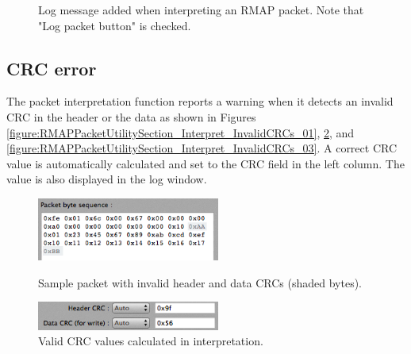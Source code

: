 \documentclass[a4paper,10pt]{article}
\begin{document}
\begin{figure}[htb]
\begin{center}
\begin{minipage}[t]{0.45\hsize}
\begin{center}
\vspace{-2mm}
\caption{Log message added when interpreting an RMAP packet. Note that "Log packet button" is checked. }
\label{figure:RMAPPacketUtilitySection_Log_Interpret}
\end{center}
\end{minipage}
\end{center}
\end{figure}


\subsection{CRC error}
The packet interpretation function reports a warning when it detects an invalid CRC in the header or the data as shown in Figures \ref{figure:RMAPPacketUtilitySection_Interpret_InvalidCRCs_01}, \ref{figure:RMAPPacketUtilitySection_Interpret_InvalidCRCs_02}, and \ref{figure:RMAPPacketUtilitySection_Interpret_InvalidCRCs_03}.
A correct CRC value is automatically calculated and set to the CRC field in the left column. The value is also displayed in the log window.


\begin{figure}[htb]
\begin{center}
\begin{minipage}[t]{0.45\hsize}
\begin{center}
\includegraphics[width=6cm]{figures/SpaceWireRMAPGUI/RMAPPacketUtilitySection_Interpret_InvalidCRCs_01.png}
\vspace{-2mm}
\caption{Sample packet with invalid header and data CRCs (shaded bytes).}
\label{figure:RMAPPacketUtilitySection_Interpret_InvalidCRCs_01}
\end{center}
\end{minipage}
\hspace{0.05\hsize}
\begin{minipage}[t]{0.45\hsize}
\begin{center}
\includegraphics[width=6cm]{figures/SpaceWireRMAPGUI/RMAPPacketUtilitySection_Interpret_InvalidCRCs_02.png}
\vspace{-2mm}
\caption{Valid CRC values calculated in interpretation.}
\label{figure:RMAPPacketUtilitySection_Interpret_InvalidCRCs_02}
\end{center}
\end{minipage}
\end{center}
\end{figure}
\end{document}
